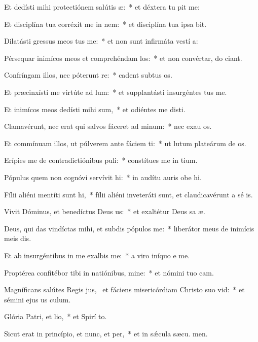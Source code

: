 \item Et dedísti mihi protectiónem salútis æ:~* et déxtera tu pit me:
\item Et disciplína tua corréxit me in nem:~* et disciplína tua ipsa  bit.
\item Dilatásti gressus meos tus me:~* et non sunt infirmáta vestí a:
\item Pérsequar inimícos meos et comprehéndam los:~* et non convértar, do ciant.
\item Confríngam illos, nec póterunt re:~* cadent subtus  os.
\item Et præcinxísti me virtúte ad lum:~* et supplantásti insurgéntes   tus me.
\item Et inimícos meos dedísti mihi sum,~* et odiéntes me disti.
\item Clamavérunt, nec erat qui salvos fáceret ad minum:~* nec exau os.
\item Et commínuam illos, ut púlverem ante fáciem ti:~* ut lutum plateárum de os.
\item Erípies me de contradictiónibus puli:~* constítues me in  tium.
\item Pópulus quem non cognóvi servívit hi:~* in audítu auris obe hi.
\item Fílii aliéni mentíti sunt hi,~* fílii aliéni inveteráti sunt, et claudicavérunt a sé is.
\item Vivit Dóminus, et benedíctus Deus us:~* et exaltétur Deus sa æ.
\item Deus, qui das vindíctas mihi, et subdis pópulos  me:~* liberátor meus de inimícis meis dis.
\item Et ab insurgéntibus in me exalbis me:~* a viro iníquo e me.
\item Proptérea confitébor tibi in natiónibus, mine:~* et nómini tuo  cam.
\item Magníficans salútes Regis jus,~\pscross{} et fáciens misericórdiam Christo suo vid:~* et sémini ejus us  culum.
\item Glória Patri, et lio,~* et Spirí to.
\item Sicut erat in princípio, et nunc, et per,~* et in sǽcula sæcu. men.

